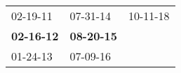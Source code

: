 \begin{supertabular}{p{0.33\columnwidth}p{0.33\columnwidth}p{0.33\columnwidth}}
          02-19-11\textsuperscript{} &           07-31-14\textsuperscript{} &  10-11-18\textsuperscript{} \\
 \textbf{02-16-12\textsuperscript{}} &  \textbf{08-20-15\textsuperscript{}} &                             \\
          01-24-13\textsuperscript{} &           07-09-16\textsuperscript{} &                             \\
\end{supertabular}
